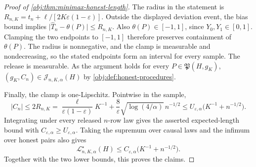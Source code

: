 \begin{proof}[Proof of \cref{obj:thm:minimax-honest-length}]
The radius in the statement is \(R_{n,K}=t_n+\ell/[2K\varepsilon(1-\varepsilon)]\). Outside the displayed deviation event, the bias bound implies
\(\lvert\widehat T_n-\theta(P)\rvert\leq R_{n,K}\). Also \(\theta(P)\in[-1,1]\), since \(Y_0,Y_1\in[0,1]\). Clamping the two endpoints to \([-1,1]\) therefore preserves containment of \(\theta(P)\). The radius is nonnegative, and the clamp is measurable and nondecreasing, so the stated endpoints form an interval for every sample. The release is measurable. As the argument holds for every \(P\in\mathfrak P(H,g_K)\), \((g_K,C_n)\in\mathcal J_{n,K,\alpha}(H)\) by \cref{obj:def:honest-procedures}. %

Finally, the clamp is one-Lipschitz. Pointwise in the sample,
\[
|C_n|
\leq 2R_{n,K}
=\frac{\ell}{\varepsilon(1-\varepsilon)}K^{-1}
 +\frac8\varepsilon\sqrt{\log(4/\alpha)}\,n^{-1/2}
\leq U_{\varepsilon,\alpha}
 \bigl(K^{-1}+n^{-1/2}\bigr).
\]
Integrating under every released \(n\)-row law gives the asserted expected-length bound with \(C_{\varepsilon,\alpha}\geq U_{\varepsilon,\alpha}\). Taking the supremum over causal laws and the infimum over honest pairs also gives
\[
\mathcal L^\star_{n,K,\alpha}(H)
\leq C_{\varepsilon,\alpha}\bigl(K^{-1}+n^{-1/2}\bigr).
\]
Together with the two lower bounds, this proves the claims. %
\end{proof}

